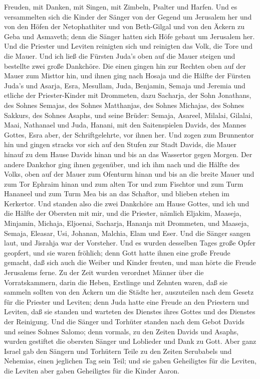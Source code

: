 Freuden, mit Danken, mit Singen, mit Zimbeln, Psalter und Harfen.
 Und es versammelten sich die Kinder der Sänger von der
Gegend um Jerusalem her und von den Höfen der Netophathiter
 und von Beth-Gilgal und von den Äckern zu Geba und
Asmaveth; denn die Sänger hatten sich Höfe gebaut um Jerusalem her.
 Und die Priester und Leviten reinigten sich und reinigten
das Volk, die Tore und die Mauer.  Und ich ließ die Fürsten
Juda's oben auf die Mauer steigen und bestellte zwei große Dankchöre.
Die einen gingen hin zur Rechten oben auf der Mauer zum Misttor hin,
 und ihnen ging nach Hosaja und die Hälfte der Fürsten
Juda's  und Asarja, Esra, Mesullam,  Juda,
Benjamin, Semaja und Jeremia  und etliche der
Priester-Kinder mit Drommeten, dazu Sacharja, der Sohn Jonathans, des
Sohnes Semajas, des Sohnes Matthanjas, des Sohnes Michajas, des Sohnes
Sakkurs, des Sohnes Asaphs,  und seine Brüder: Semaja,
Asareel, Milalai, Gilalai, Maai, Nathanael und Juda, Hanani, mit den
Saitenspielen Davids, des Mannes Gottes, Esra aber, der Schriftgelehrte,
vor ihnen her.  Und zogen zum Brunnentor hin und gingen
stracks vor sich auf den Stufen zur Stadt Davids, die Mauer hinauf zu
dem Hause Davids hinan und bis an das Wassertor gegen Morgen.
 Der andere Dankchor ging ihnen gegenüber, und ich ihm nach
und die Hälfte des Volks, oben auf der Mauer zum Ofenturm hinan und bis
an die breite Mauer  und zum Tor Ephraim hinan und zum
alten Tor und zum Fischtor und zum Turm Hananeel und zum Turm Mea bis an
das Schaftor, und blieben stehen im Kerkertor.  Und standen
also die zwei Dankchöre am Hause Gottes, und ich und die Hälfte der
Obersten mit mir,  und die Priester, nämlich Eljakim,
Maaseja, Minjamin, Michaja, Eljoenai, Sacharja, Hananja mit Drommeten,
 und Maaseja, Semaja, Eleasar, Usi, Johanan, Malchia, Elam
und Eser. Und die Sänger sangen laut, und Jisrahja war der Vorsteher.
 Und es wurden desselben Tages große Opfer geopfert, und
sie waren fröhlich; denn Gott hatte ihnen eine große Freude gemacht, daß
sich auch die Weiber und Kinder freuten, und man hörte die Freude
Jerusalems ferne.  Zu der Zeit wurden verordnet Männer über
die Vorratskammern, darin die Heben, Erstlinge und Zehnten waren, daß
sie sammeln sollten von den Äckern um die Städte her, auszuteilen nach
dem Gesetz für die Priester und Leviten; denn Juda hatte eine Freude an
den Priestern und Leviten, daß sie standen  und warteten
des Dienstes ihres Gottes und des Dienstes der Reinigung. Und die Sänger
und Torhüter standen nach dem Gebot Davids und seines Sohnes Salomo;
 denn vormals, zu den Zeiten Davids und Asaphs, wurden
gestiftet die obersten Sänger und Loblieder und Dank zu Gott.
 Aber ganz Israel gab den Sängern und Torhütern Teile zu
den Zeiten Serubabels und Nehemias, einen jeglichen Tag sein Teil; und
sie gaben Geheiligtes für die Leviten, die Leviten aber gaben
Geheiligtes für die Kinder Aaron.

